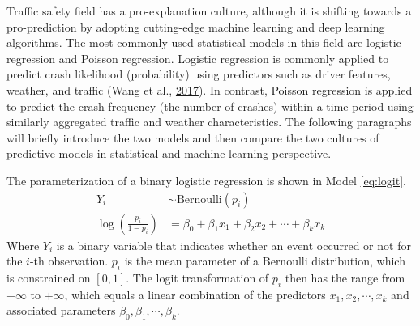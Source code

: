 \documentclass[12pt]{book}
\numberwithin{equation}{chapter}
\begin{document}
Traffic safety field has a pro-explanation culture, although it is shifting towards a pro-prediction by adopting cutting-edge machine learning and deep learning algorithms. The most commonly used statistical models in this field are logistic regression and Poisson regression. Logistic regression is commonly applied to predict crash likelihood (probability) using predictors such as driver features, weather, and traffic (Wang et al., \protect\hyperlink{ref-wang2017safety}{2017}). In contrast, Poisson regression is applied to predict the crash frequency (the number of crashes) within a time period using similarly aggregated traffic and weather characteristics. The following paragraphs will briefly introduce the two models and then compare the two cultures of predictive models in statistical and machine learning perspective.

The parameterization of a binary logistic regression is shown in Model \eqref{eq:logit}.
\begin{equation}
\begin{split}
Y_i & \sim \text{Bernoulli}(p_i) \\
\log(\frac{p_i}{1 - p_i}) & = \beta_0 + \beta_1x_1 + \beta_2x_2 + \cdots + \beta_kx_k
\label{eq:logit}
\end{split}
\end{equation}
Where \(Y_i\) is a binary variable that indicates whether an event occurred or not for the \(i\)-th observation. \(p_i\) is the mean parameter of a Bernoulli distribution, which is constrained on \([0, 1]\). The logit transformation of \(p_i\) then has the range from \(-\infty\) to \(+\infty\), which equals a linear combination of the predictors \(x_1, x_2, \cdots, x_k\) and associated parameters \(\beta_0, \beta_1, \cdots, \beta_k\).
\end{document}
